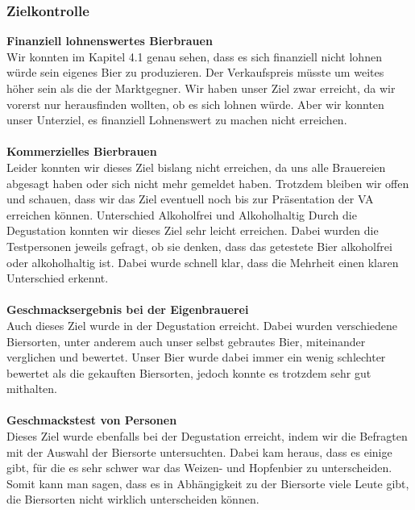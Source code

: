 \subsubsection{Zielkontrolle}
\textbf{Finanziell lohnenswertes Bierbrauen}\\
Wir konnten im Kapitel 4.1 genau sehen, dass es sich finanziell nicht lohnen würde sein eigenes Bier zu produzieren. Der Verkaufspreis müsste um weites höher sein als die der Marktgegner. Wir haben unser Ziel zwar erreicht, da wir vorerst nur herausfinden wollten, ob es sich lohnen würde. Aber wir konnten unser Unterziel, es finanziell Lohnenswert zu machen nicht erreichen.
\\\\
\textbf{Kommerzielles Bierbrauen}\\
Leider konnten wir dieses Ziel bislang nicht erreichen, da uns alle Brauereien abgesagt haben oder sich nicht mehr gemeldet haben. Trotzdem bleiben wir offen und schauen, dass wir das Ziel eventuell noch bis zur Präsentation der VA erreichen können.
Unterschied Alkoholfrei und Alkoholhaltig
Durch die Degustation konnten wir dieses Ziel sehr leicht erreichen. Dabei wurden die Testpersonen jeweils gefragt, ob sie denken, dass das getestete Bier alkoholfrei oder alkoholhaltig ist. Dabei wurde schnell klar, dass die Mehrheit einen klaren Unterschied erkennt.
\\\\
\textbf{Geschmacksergebnis bei der Eigenbrauerei}\\
Auch dieses Ziel wurde in der Degustation erreicht. Dabei wurden verschiedene Biersorten, unter anderem auch unser selbst gebrautes Bier, miteinander verglichen und bewertet. Unser Bier wurde dabei immer ein wenig schlechter bewertet als die gekauften Biersorten, jedoch konnte es trotzdem sehr gut mithalten.
\\\\
\textbf{Geschmackstest von Personen}\\
Dieses Ziel wurde ebenfalls bei der Degustation erreicht, indem wir die Befragten mit der Auswahl der Biersorte untersuchten. Dabei kam heraus, dass es einige gibt, für die es sehr schwer war das Weizen- und Hopfenbier zu unterscheiden. Somit kann man sagen, dass es in Abhängigkeit zu der Biersorte viele Leute gibt, die Biersorten nicht wirklich unterscheiden können.
\\\\
\newpage
